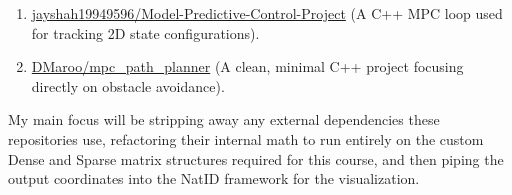 \documentclass[12pt]{article}
\begin{document}
\begin{enumerate}
    \item \href{https://github.com/jayshah19949596/Model-Predictive-Control-Project}{jayshah19949596/Model-Predictive-Control-Project} (A C++ MPC loop used for tracking 2D state configurations).
    \item \href{https://github.com/DMaroo/mpc_path_planner}{DMaroo/mpc\_path\_planner} (A clean, minimal C++ project focusing directly on obstacle avoidance).
\end{enumerate}

My main focus will be stripping away any external dependencies these repositories use, refactoring their internal math to run entirely on the custom Dense and Sparse matrix structures required for this course, and then piping the output coordinates into the NatID framework for the visualization.
\end{document}
